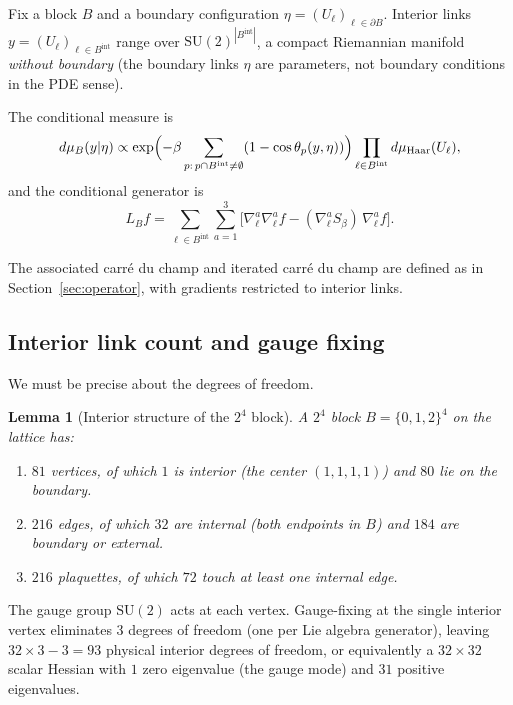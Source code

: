 \documentclass[11pt,a4paper]{article}
\theoremstyle{plain}
\newtheorem{lemma}[theorem]{Lemma}
\theoremstyle{definition}
\theoremstyle{remark}
\newcommand{\SU}{\mathrm{SU}}
\begin{document}
Fix a block $B$ and a boundary configuration
$\eta = (U_\ell)_{\ell \in \partial B}$. Interior links
$y = (U_\ell)_{\ell \in B^{\mathrm{int}}}$ range over
$\SU(2)^{|B^{\mathrm{int}}|}$, a compact Riemannian manifold
\emph{without boundary} (the boundary links $\eta$ are parameters,
not boundary conditions in the PDE sense).

The conditional measure is
\begin{equation}
d\mu_B(y|\eta) \propto \exp\Bigl(-\beta\sum_{p:\,p \cap B^{\mathrm{int}}
\neq \emptyset} (1-\cos\theta_p(y,\eta))\Bigr)
\prod_{\ell \in B^{\mathrm{int}}} d\mu_{\mathrm{Haar}}(U_\ell),
\end{equation}
and the conditional generator is
\begin{equation}
L_B f = \sum_{\ell \in B^{\mathrm{int}}} \sum_{a=1}^3
\bigl[\nabla_\ell^a \nabla_\ell^a f
- (\nabla_\ell^a S_\beta)\,\nabla_\ell^a f\bigr].
\end{equation}

The associated carr\'e du champ and iterated carr\'e du champ are
defined as in Section~\ref{sec:operator}, with gradients restricted
to interior links.

\subsection{Interior link count and gauge fixing}

We must be precise about the degrees of freedom.

\begin{lemma}[Interior structure of the $2^4$ block]\label{lem:interior-count}
A $2^4$ block $B = \{0,1,2\}^4$ on the lattice has:
\begin{enumerate}[label=(\alph*)]
\item $81$ vertices, of which $1$ is interior (the center $(1,1,1,1)$)
  and $80$ lie on the boundary.
\item $216$ edges, of which $32$ are internal (both endpoints in $B$)
  and $184$ are boundary or external.
\item $216$ plaquettes, of which $72$ touch at least one internal edge.
\end{enumerate}
\end{lemma}

The gauge group $\SU(2)$ acts at each vertex. Gauge-fixing at the
single interior vertex eliminates $3$ degrees of freedom (one per Lie
algebra generator), leaving $32 \times 3 - 3 = 93$ physical interior
degrees of freedom, or equivalently a $32 \times 32$ scalar Hessian
with $1$ zero eigenvalue (the gauge mode) and $31$ positive eigenvalues.
\end{document}
